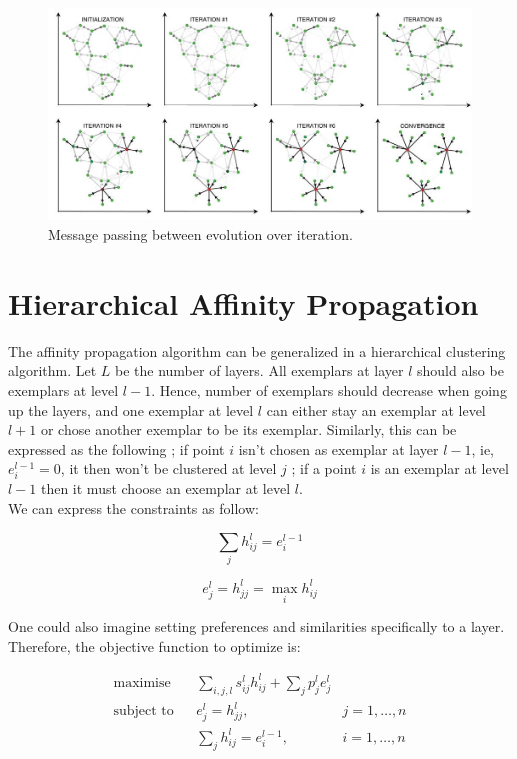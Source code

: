 \documentclass{ipol}
\begin{document}
\begin{figure}
\includegraphics[width=500px]{./images/AP_frey.png}
\caption{Message passing between evolution over iteration.}
\end{figure}

\section{Hierarchical Affinity Propagation}

The affinity propagation algorithm can be generalized in a hierarchical
clustering algorithm. Let $L$ be the number of layers. All exemplars at layer
$l$ should also be exemplars at level $l -1$. Hence, number of exemplars
should decrease when going up the layers, and one exemplar at level $l$ can
either stay an exemplar at level $l + 1$ or chose another exemplar to be its
exemplar. Similarly, this can be expressed as the following ; if point $i$ isn't chosen as
exemplar at layer $l - 1$, ie, $e_{i}^{l - 1} = 0$, it then won't be clustered at
level $j$ ; if a point $i$ is an exemplar at level $l -1$ then it must choose
an exemplar at level $l$.\\
We can express the constraints as follow:

\begin{equation}
\sum_{j} h_{ij}^l = e_i^{l-1}
\end{equation}

\begin{equation}
e_j^l = h_{jj}^l = \max_i h_{ij}^l
\end{equation}

One could also imagine setting preferences and similarities specifically to a
layer. Therefore, the objective function to optimize is:

\begin{equation*}
\renewcommand{\arraystretch}{2}
\begin{array}{ccll}
\text{maximise} & & \sum_{i, j, l} s^l_{ij} h^l_{ij} + \sum_{j} p^l_j e^l_j \\
\text{subject to} &  & e^l_{j} = h^l_{jj}, & j = 1, \dots, n\\
		  &  & \sum_{j} h_{ij}^l = e_i^{l-1}, & i = 1, \dots, n\\

\end{array}
\end{equation*}
\end{document}
